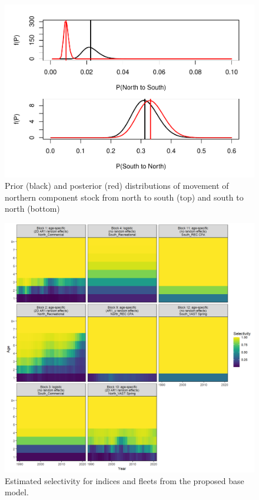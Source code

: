 \documentclass[
]{article}
\begin{document}
\begin{figure}

{\centering \includegraphics{bsb_models_wp_files/figure-latex/move-prior-posterior-1} 

}

\caption{Prior (black) and posterior (red) distributions of movement of northern component stock from north to south (top) and south to north (bottom)}\label{fig:move-prior-posterior}
\end{figure}

\clearpage
\begin{figure}

{\centering \includegraphics[width=1\linewidth]{../2023.RT.Runs/Run34/plots_png/results/SelAA_tile} 

}

\caption{Estimated selectivity for indices and fleets from the proposed base model.}\label{fig:selectivity}
\end{figure}
\end{document}
